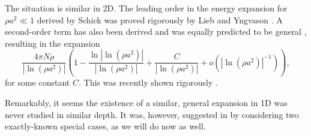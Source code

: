 \documentclass[a4paper,11pt]{article}
\newcommand{\abs}[1]{\left\lvert #1 \right\rvert}
\numberwithin{equation}{section}
\begin{document}
	The situation is similar in 2D. The leading order in the energy expansion for $\rho a^2\ll1$ derived by Schick \cite{schick1971two} was proved rigorously by Lieb and Yngvason \cite{lieb2001ground}. A second-order term has also been derived and was equally predicted to be general \cite{andersen2002ground,mora2009ground,fournais2019ground}, resulting in the expansion
	\begin{equation}
		\label{result2D}
		\frac{4\pi N\rho}{\abs{\ln(\rho a^2)}}\left(1-\frac{\ln{\abs{\ln(\rho a^2)}}}{\abs{\ln(\rho a^2)}}+\frac{C}{\abs{\ln(\rho a^2)}}+o\left(\abs{\ln(\rho a^2)}^{-1}\right)\right),
	\end{equation}
	for some constant $C$. This was recently shown rigorously \cite{fournais2022ground}. 
	
	Remarkably, it seems the existence of a similar, general expansion in 1D was never studied in similar depth. It was, however, suggested in \cite{astrakharchik2010low} by considering two exactly-known special cases, as we will do now as well.
	
\end{document}
